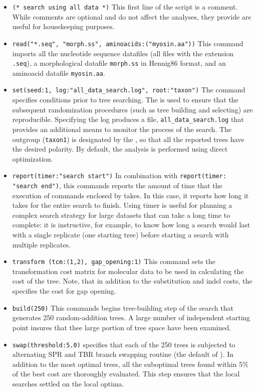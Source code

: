 \begin{itemize}
\item \texttt{(* search using all data *)} This first line of the script is a comment. While comments are optional and do not affect the analyses, they provide are useful for housekeeping purposes.
\item \texttt{read("*.seq", "morph.ss", aminoacids:("myosin.aa"))}
This command imports all the nucleotide sequence datafiles (all files with the extension \texttt{.seq}), a morphological datafile \texttt{morph.ss} in Hennig86 format, and an aminoacid datafile \texttt{myosin.aa}.
\item \texttt{set(seed:1, log:"all\_data\_search.log", root:"taxon")} The  command specifies conditions prior to tree searching. The  is used to ensure that the subsequent randomization procedures (such as tree building and selecting) are reproducible. Specifying the log produces a file, \texttt{all\_data\_search.log} that provides an additional means to monitor the process of the search. The outgroup (\texttt{taxon1}) is designated by the , so that all the reported trees have the desired polarity. By default, the analysis is performed using direct optimization.
\item \texttt{report(timer:"search start")} In combination with \texttt{report(timer:\\"search end")}, this commands reports the amount of time that the execution of commands enclosed by  takes. In this case, it reports how long it takes for the entire search to finish. Using timer is useful for planning a complex search strategy for large datasets that can take a long time to complete: it is instructive, for example, to know how long a search would last with a single replicate (one starting tree) before starting a search with multiple replicates.
\item \texttt{transform (tcm:(1,2), gap\_opening:1)} This command sets the transformation cost matrix for molecular data to be used in calculating the cost of the tree. Note, that in addition to the substitution and indel costs, the  specifies the cost for gap opening.
\item \texttt{build(250)} This commands begins tree-building step of the search that generates 250 random-addition trees. A large number of independent starting point insures that thee large portion of tree space have been examined.
\item \texttt{swap(threshold:5.0)}  specifies that each of the 250 trees is subjected to alternating SPR and TBR branch swapping routine (the default of \poy). In addition to the most optimal trees, all the suboptimal trees found within 5\% of the best cost are thoroughly evaluated. This step ensures that the local searches settled on the local optima.

\end{itemize}
